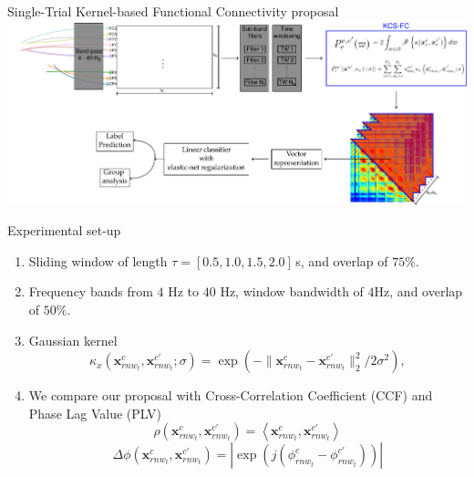 \documentclass[aspectratio=169]{beamer}
\begin{document}
\begin{frame}{Single-Trial Kernel-based Functional Connectivity proposal}
    \includegraphics[scale=0.5]{../Tesis_document/Figures/outline_and_contributions/contribution1_C.pdf}
\end{frame}

\begin{frame}{Experimental set-up}
    \begin{enumerate}
        \item Sliding window of length $\tau=[0.5,1.0,1.5,2.0]$\,{s}, and overlap of $75\%$.
        \item Frequency bands from $4$ Hz to $40$ Hz, window bandwidth of $4$Hz, and overlap of $50\%$.
        \item Gaussian kernel
        \[
        \kappa_x\left(\mathbf{x}^{c}_{rnw_t}, \mathbf{x}^{c'}_{rnw_t};\sigma\right) = \exp{\left( {-\|\mathbf{x}^{c}_{rnw_t}-\mathbf{x}^{c'}_{rnw_t}\|^2_2}/{2\sigma^2}\right)},
        \]
        \item We compare our proposal with {Cross-Correlation Coefficient} (CCF) and {Phase Lag Value} (PLV)
        \[
        \rho(\mathbf{x}^{c}_{rnw_t},\mathbf{x}^{c'}_{rnw_t}) ={\left<\mathbf{x}^{c}_{rnw_t},\mathbf{x}^{c'}_{rnw_t}\right>}
        \]
        \[
        \Delta\phi(\mathbf{x}^{c}_{rnw_t},\mathbf{x}^{c'}_{rnw_t}) = {|\exp(j(\phi_{rnw_t}^{c}-\phi_{rnw_t}^{c'}))|}
        \]
    \end{enumerate}
\end{frame}
\end{document}
